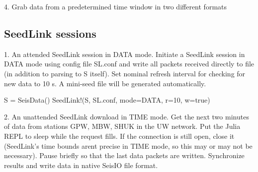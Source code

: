 \documentclass[letterpaper,11pt,english]{sphinxmanual}
\begin{document}
4. Grab data from a predetermined time window in two different formats

%
\begin{sphinxVerbatim}[commandchars=\\\{\}]
  
  
      
      
\end{sphinxVerbatim}


\subsection{SeedLink sessions}
\label{\detokenize{src/Appendices/examples:seedlink-sessions}}
1. An attended SeedLink session in DATA mode. Initiate a SeedLink session in DATA mode using config file SL.conf and write all packets received directly to file (in addition to parsing to S itself). Set nominal refresh interval for checking for new data to 10 s. A mini-seed file will be generated automatically.

%
\begin{sphinxVerbatim}[commandchars=\\\{\}]
S = SeisData()
SeedLink!(S, \PYGZdq{}SL.conf\PYGZdq{}, mode=\PYGZdq{}DATA\PYGZdq{}, r=10, w=true)
\end{sphinxVerbatim}

2. An unattended SeedLink download in TIME mode. Get the next two minutes of data from stations GPW, MBW, SHUK in the UW network. Put the Julia REPL to sleep while the request fills. If the connection is still open, close it (SeedLink’s time bounds arent precise in TIME mode, so this may or may not be necessary). Pause briefly so that the last data packets are written. Synchronize results and write data in native SeisIO file format.
\end{document}
